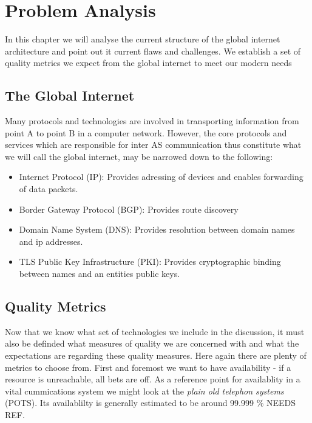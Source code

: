 \documentclass[../eva1_scion.tex]{subfiles}
\begin{document}
\section{Problem Analysis}\label{sec:analysis}

In this chapter we will analyse the current structure of the global internet architecture and point out it current flaws and challenges. We establish a set of quality metrics we expect from the global internet to meet our modern needs

\subsection{The Global Internet}%
\label{ssec:the_global_internet}

Many protocols and technologies are involved in transporting information from point A to point B in a computer network. However, the core protocols and services which are responsible for inter AS  communication thus constitute what we will call the global internet, may be narrowed down to the following:

\begin{itemize}
    \item Internet Protocol (IP): Provides adressing of devices and enables forwarding of data packets.
    \item Border Gateway Protocol (BGP): Provides route discovery \cite{rfc_bgp}
    \item Domain Name System (DNS): Provides resolution between domain names and ip addresses.
    \item TLS Public Key Infrastructure (PKI): Provides cryptographic binding between names and an entities public keys.
\end{itemize}

\subsection{Quality Metrics}\label{ssec:quality_metrics}

Now that we know what set of technologies we include in the discussion, it must also be definded what measures of quality we are concerned with and what the expectations are regarding these quality measures. Here again there are plenty of metrics to choose from. First and foremost we want to have availability - if a resource is unreachable, all bets are off. As a reference point for availablity in a vital cummications system we might look at the \textit{plain old telephon systems} (POTS). Its availablilty is generally estimated to be around 99.999 \% NEEDS REF.
\end{document}
